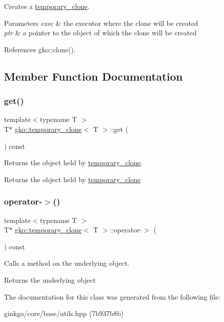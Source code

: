 Creates a \hyperlink{classgko_1_1temporary__clone}{temporary\+\_\+clone}. 


\begin{DoxyParams}{Parameters}
{\em exec} & the executor where the clone will be created \\
\hline
{\em ptr} & a pointer to the object of which the clone will be created \\
\hline
\end{DoxyParams}


References gko\+::clone().



\subsection{Member Function Documentation}
\mbox{\label{classgko_1_1temporary__clone_a38042e39a039070cc97e225435d5ed9e}} 
\subsubsection{\texorpdfstring{get()}{get()}}
{\footnotesize\ttfamily template$<$typename T $>$ \\
T$\ast$ \hyperlink{classgko_1_1temporary__clone}{gko\+::temporary\+\_\+clone}$<$ T $>$\+::get (\begin{DoxyParamCaption}{ }\end{DoxyParamCaption}) const}



Returns the object held by \hyperlink{classgko_1_1temporary__clone}{temporary\+\_\+clone}. 

\begin{DoxyReturn}{Returns}
the object held by \hyperlink{classgko_1_1temporary__clone}{temporary\+\_\+clone} 
\end{DoxyReturn}
\mbox{\label{classgko_1_1temporary__clone_a007bc247a9a250dcec8cdadb54710106}} 
\subsubsection{\texorpdfstring{operator-\/$>$()}{operator->()}}
{\footnotesize\ttfamily template$<$typename T $>$ \\
T$\ast$ \hyperlink{classgko_1_1temporary__clone}{gko\+::temporary\+\_\+clone}$<$ T $>$\+::operator-\/$>$ (\begin{DoxyParamCaption}{ }\end{DoxyParamCaption}) const}



Calls a method on the underlying object. 

\begin{DoxyReturn}{Returns}
the underlying object 
\end{DoxyReturn}


The documentation for this class was generated from the following file\+:\begin{DoxyCompactItemize}
\item 
ginkgo/core/base/utils.\+hpp (7b937b8b)\end{DoxyCompactItemize}
